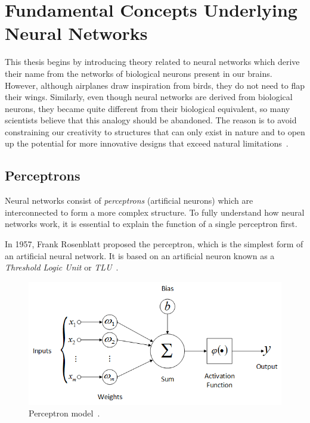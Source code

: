 \chapter{Fundamental Concepts Underlying Neural Networks}
\label{cha:fundanemtalConcepts}


This thesis begins by introducing theory related to neural networks which derive their name from the networks of biological neurons present in our brains. However, although airplanes draw inspiration from birds, they do not need to flap their wings. Similarly, even though neural networks are derived from biological neurons, they became quite different from their biological equivalent, so many scientists believe that this analogy should be abandoned. The reason is to avoid constraining our creativity to structures that can only exist in nature and to open up the potential for more innovative designs that exceed natural limitations~\cite{UMzUSLiTF}.

\section{Perceptrons}

Neural networks consist of \textit{perceptrons} (artificial neurons) which are interconnected to form a more complex structure. To fully understand how neural networks work, it is essential to explain the function of a single perceptron first.

In 1957, Frank Rosenblatt proposed the perceptron, which is the simplest form of an artificial neural network. It is based on an artificial neuron known as a \textit{Threshold Logic Unit} or \textit{TLU}~\cite{UMzUSLiTF}.

\begin{figure}[!htb]
    \centering
    \includegraphics[scale=0.6]{Images/perceprton-model.png}
    \caption{Perceptron model~\cite{PerceptronModel}.}
    \label{fig:perceptronModel}
\end{figure}

